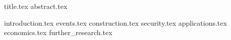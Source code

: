 \documentclass[11pt]{llncs}
\begin{document}
{title.tex}
\thispagestyle{plain}
{abstract.tex}

{introduction.tex}
{events.tex}
{construction.tex}
{security.tex}
{applications.tex}
{economics.tex}
{further_research.tex}



\end{document}
